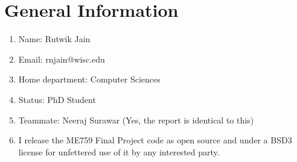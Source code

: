 \documentclass[12pt]{article}
\theoremstyle{definition}
\begin{document}
\newpage
\renewcommand{\baselinestretch}{0.2}\normalsize
\tableofcontents
\renewcommand{\baselinestretch}{1.0}\normalsize

\newpage
\section{General Information}
\begin{enumerate}
    \item Name: Rutwik Jain
    \item Email: rnjain@wisc.edu
    \item Home department: Computer Sciences
    \item Status: PhD Student
    \item Teammate: Neeraj Surawar (Yes, the report is identical to this)
    \item I release the ME759 Final Project code as open source and under a BSD3 license for unfettered use of it by any interested party.
\end{enumerate}



\newpage





\printbibliography
\end{document}

